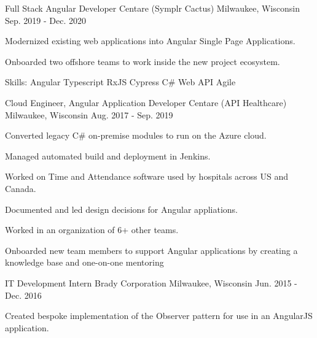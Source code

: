 \begin{cventries}
  \cventry
    {Full Stack Angular Developer} %
    {Centare (Symplr Cactus)} %
    {Milwaukee, Wisconsin} %
    {Sep. 2019 - Dec. 2020} %
    {
      \begin{cvitems} %
        \item {Modernized existing web applications into Angular Single Page Applications.}
        \item {Onboarded two offshore teams to work inside the new project ecosystem.}
        \item {Skills: Angular \textbullet{} Typescript \textbullet{} RxJS \textbullet{} Cypress \textbullet{} C\# Web API \textbullet{} Agile}
      \end{cvitems}
    }

  \cventry
    {Cloud Engineer, Angular Application Developer} %
    {Centare (API Healthcare)} %
    {Milwaukee, Wisconsin} %
    {Aug. 2017 - Sep. 2019} %
    {
      \begin{cvitems} %
        \item {Converted legacy C\# on-premise modules to run on the Azure cloud.}
        \item {Managed automated build and deployment in Jenkins.}
        \item {Worked on Time and Attendance software used by hospitals across US and Canada.}
        \item {Documented and led design decisions for Angular appliations.}
        \item {Worked in an organization of 6+ other teams.}
        \item {Onboarded new team members to support Angular applications by creating a knowledge base and one-on-one mentoring}
      \end{cvitems}
    }

  \cventry
    {IT Development Intern} %
    {Brady Corporation} %
    {Milwaukee, Wisconsin} %
    {Jun. 2015 - Dec. 2016} %
    {
      \begin{cvitems} %
        \item {Created bespoke implementation of the Observer pattern for use in an AngularJS application.}
      \end{cvitems}
    }

\end{cventries}
